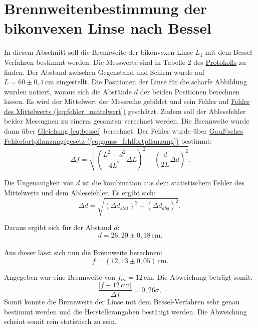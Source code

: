 \section{Brennweitenbestimmung der bikonvexen Linse nach Bessel}
\label{sec:auswertung_brennweite_bikonvex}
In diesem Abschnitt soll die Brennweite der bikonvexen Linse $L_1$ mit dem Bessel-Verfahren bestimmt werden. Die Messwerte sind in Tabelle 2 des \hyperref[Protokoll]{Protokolls} zu finden. Der Abstand zwischen Gegenstand und Schirm wurde auf $L = 60 \pm 0{,}1\,\mathrm{cm}$ eingestellt. Die Positionen der Linse für die scharfe Abbildung wurden notiert, woraus sich die Abstände $d$ der beiden Positionen berechnen lassen. Es wird der Mittelwert der Messreihe gebildet und sein Fehler auf \hyperref[eq:fehler_mittelwert]{Fehler des Mittelwerts (\ref*{eq:fehler_mittelwert})} geschätzt. Zudem soll der Ablesefehler beider Messugnen zu einerm gesamten verechnet werden. Die Brennweite wurde dann über \hyperref[eq:bessel]{Gleichung \ref*{eq:bessel}} berechnet. Der Fehler wurde über \hyperref[eq:gauss_fehlfortpflanzung]{Gauß'sches Fehlerfortpflanzungsgesetz (\ref*{eq:gauss_fehlfortpflanzung})} bestimmt:
\begin{equation}
    \Delta f = \sqrt{\left(\frac{L^2 + d^2}{4L^2} \Delta L\right)^2 + \left(\frac{d}{2L} \Delta d\right)^2}.
\end{equation}

Die Ungenauigkeit von $d$ ist die kombination aus dem statistischem Fehler des Mittelwerts und dem Ablesefehler. Es ergibt sich:
\begin{equation}
    \Delta d = \sqrt{(\Delta d_{stat})^2 + (\Delta d_{abg})^2},
\end{equation}

Daraus ergibt sich für der Abstand $d$:
\begin{equation}
    \underline{
        d = 26{,}20 \pm 0{,}18\,\mathrm{cm}.
    }
\end{equation}

Aus dieser lässt sich nun die Brennweite berechnen:
\begin{equation}
    \boxed{
        f = (12{,}13 \pm 0{,}05)\,\mathrm{cm}.
    }
\end{equation}

Angegeben war eine Brennweite von $f_{lit} = 12\,\mathrm{cm}$. Die Abweichung beträgt somit:
\begin{equation}
    \frac{\left| f - 12 \, \mathrm{cm} \right|}{\Delta f} = 0,26\sigma,
\end{equation}
Somit konnte die Brennweite der Linse mit dem Bessel-Verfahren sehr genau bestimmt werden und die Herstellerangaben bestätigt werden. Die Abweichung scheint somit rein statistisch zu sein.

